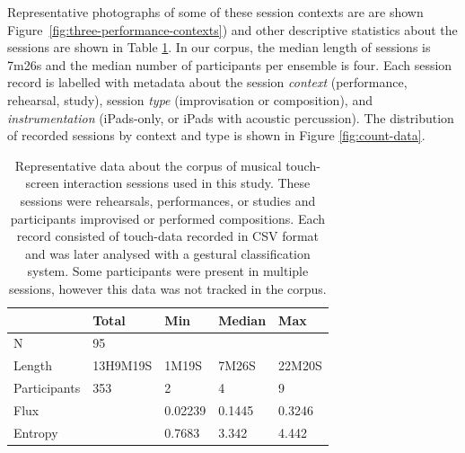 \documentclass{sigchi}
\begin{document}
Representative photographs of some of these session contexts are are
shown Figure~\ref{fig:three-performance-contexts}) and other
descriptive statistics about the sessions are shown in Table
\ref{corpus-table}. In our corpus, the median length of sessions is
7m26s and the median number of participants per ensemble is four. Each
session record is labelled with metadata about the session
\emph{context} (performance, rehearsal, study), session \emph{type}
(improvisation or composition), and \emph{instrumentation}
(iPads-only, or iPads with acoustic percussion). The distribution of
recorded sessions by context and type is shown in Figure
\ref{fig:count-data}.


\begin{table}
\centering
\begin{tabular}{l|llll}
\hline
            & Total & Min  & Median   & Max     \\ 
\hline
N           & 95    &      &          &         \\
Length & 13H9M19S & 1M19S & 7M26S & 22M20S \\
Participants& 353   & 2    & 4        & 9        \\
Flux &   & 0.02239 & 0.1445 & 0.3246\\
Entropy &   & 0.7683 & 3.342 & 4.442\\          
\hline
\end{tabular}
\caption{
  Representative data about the corpus of musical touch-screen
  interaction sessions used in this study. These sessions were
  rehearsals, performances, or studies and
  participants improvised or performed compositions. Each record
  consisted of touch-data recorded in CSV format and was later analysed
  with a gestural classification system. Some participants were
  present in multiple sessions, however this data was not tracked in
  the corpus.\label{corpus-table}}
\end{table}
\end{document}

